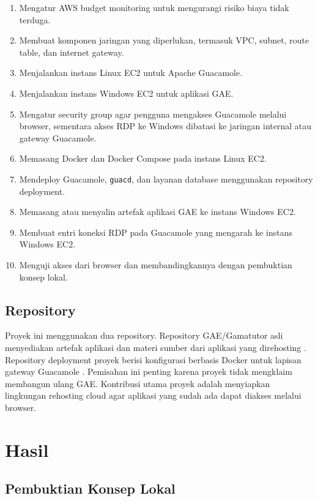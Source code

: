 \documentclass[conference]{IEEEtran}
\begin{document}
\begin{enumerate}
    \item Mengatur AWS budget monitoring untuk mengurangi risiko biaya tidak terduga.
    \item Membuat komponen jaringan yang diperlukan, termasuk VPC, subnet, route table, dan internet gateway.
    \item Menjalankan instans Linux EC2 untuk Apache Guacamole.
    \item Menjalankan instans Windows EC2 untuk aplikasi GAE.
    \item Mengatur security group agar pengguna mengakses Guacamole melalui browser, sementara akses RDP ke Windows dibatasi ke jaringan internal atau gateway Guacamole.
    \item Memasang Docker dan Docker Compose pada instans Linux EC2.
    \item Mendeploy Guacamole, \texttt{guacd}, dan layanan database menggunakan repository deployment.
    \item Memasang atau menyalin artefak aplikasi GAE ke instans Windows EC2.
    \item Membuat entri koneksi RDP pada Guacamole yang mengarah ke instans Windows EC2.
    \item Menguji akses dari browser dan membandingkannya dengan pembuktian konsep lokal.
\end{enumerate}

\subsection{Repository}

Proyek ini menggunakan dua repository. Repository GAE/Gamatutor asli menyediakan artefak aplikasi dan materi sumber dari aplikasi yang direhosting \cite{gamatutor}. Repository deployment proyek berisi konfigurasi berbasis Docker untuk lapisan gateway Guacamole \cite{deployment-repo}. Pemisahan ini penting karena proyek tidak mengklaim membangun ulang GAE. Kontribusi utama proyek adalah menyiapkan lingkungan rehosting cloud agar aplikasi yang sudah ada dapat diakses melalui browser.

\section{Hasil}

\subsection{Pembuktian Konsep Lokal}
\end{document}
